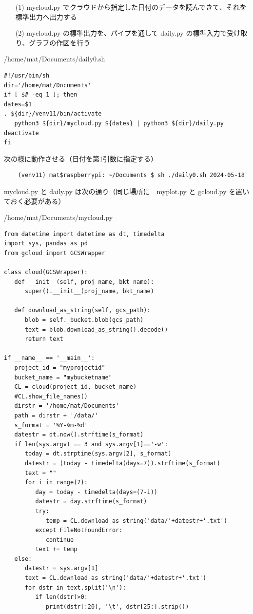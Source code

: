 \documentclass[12pt,a4paper,uplatex]{jsbook}
\begin{document}
\begin{enumerate}
\item[(1)] mycloud.py でクラウドから指定した日付のデータを読んできて、それを標準出力へ出力する
\item[(2)] mycloud.py の標準出力を、パイプを通して daily.py の標準入力で受け取り、グラフの作図を行う
\end{enumerate}

\begin{itembox}[l]{/home/mat/Documents/daily0.sh}
	\begin{verbatim}
#!/usr/bin/sh
dir='/home/mat/Documents'
if [ $# -eq 1 ]; then
dates=$1
. ${dir}/venv11/bin/activate
   python3 ${dir}/mycloud.py ${dates} | python3 ${dir}/daily.py
deactivate
fi
	\end{verbatim}
\end{itembox}

次の様に動作させる（日付を第1引数に指定する）

\begin{screen}
\begin{verbatim}
	(venv11) mat$raspberrypi: ~/Documents $ sh ./daily0.sh 2024-05-18
\end{verbatim}
\end{screen}

mycloud.py と daily.py は次の通り（同じ場所に　myplot.py と gcloud.py を置いておく必要がある）

\begin{spacing}{0.87}
\begin{itembox}[l]{/home/mat/Documents/mycloud.py}
	\begin{verbatim}
from datetime import datetime as dt, timedelta
import sys, pandas as pd
from gcloud import GCSWrapper

class cloud(GCSWrapper):
   def __init__(self, proj_name, bkt_name):
      super().__init__(proj_name, bkt_name)

   def download_as_string(self, gcs_path):
      blob = self._bucket.blob(gcs_path)
      text = blob.download_as_string().decode()
      return text

if __name__ == '__main__':
   project_id = "myprojectid"
   bucket_name = "mybucketname"
   CL = cloud(project_id, bucket_name)
   #CL.show_file_names()
   dirstr = '/home/mat/Documents'
   path = dirstr + '/data/'
   s_format = '%Y-%m-%d'
   datestr = dt.now().strftime(s_format)
   if len(sys.argv) == 3 and sys.argv[1]=='-w':
      today = dt.strptime(sys.argv[2], s_format)
      datestr = (today - timedelta(days=7)).strftime(s_format)
      text = ""
      for i in range(7):
         day = today - timedelta(days=(7-i))
         datestr = day.strftime(s_format)
         try:
            temp = CL.download_as_string('data/'+datestr+'.txt')
         except FileNotFoundError:
            continue
         text += temp   
   else:
      datestr = sys.argv[1]
      text = CL.download_as_string('data/'+datestr+'.txt')
      for dstr in text.split('\n'):
         if len(dstr)>0:
            print(dstr[:20], '\t', dstr[25:].strip())
   \end{verbatim}
\end{itembox}
   \end{spacing}
\end{document}
